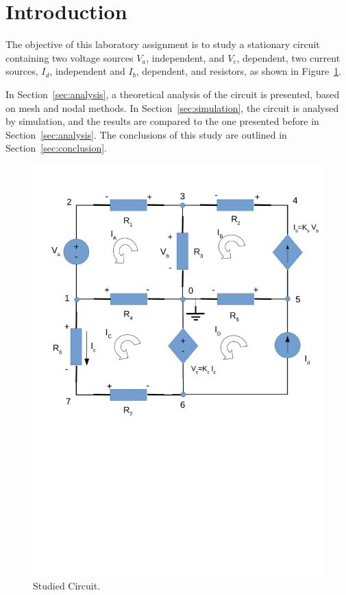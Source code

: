 \section{Introduction}
\label{sec:introduction}

The objective of this laboratory assignment is to study a stationary circuit containing two
voltage sources $V_a$, independent, and $V_c$, dependent, two current sources, $I_d$, independent and $I_b$, dependent, and resistors, as shown in Figure~\ref{fig:rc}.


In Section~\ref{sec:analysis}, a theoretical analysis of the circuit is
presented, based on mesh and nodal methods. In Section~\ref{sec:simulation}, the circuit is analysed by
simulation, and the results are compared to the one presented before in Section~\ref{sec:analysis}. The conclusions of this study are outlined in
Section~\ref{sec:conclusion}.

\begin{figure}[h] \centering
\includegraphics[width=0.4\linewidth]{circuito1.pdf}
\caption{Studied Circuit.}
\label{fig:rc}
\end{figure}

